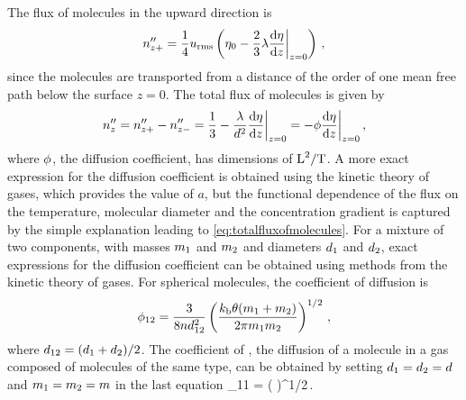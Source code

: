 The flux of molecules in the upward direction is
\begin{equation}\label{eq:totalupfluxofmolecules}
{n}^{\prime\prime}_{z+} = \dfrac{1}{4}u_\text{rms}
                    \left(\eta_0 - \dfrac{2}{3}\lambda\dfrac{\text{d}{\eta}}{\text{d}{z}}\biggr\rvert_{z = 0}\right)\,,
\end{equation}
since the molecules are transported from a distance of the order of one mean free path below the surface $z = 0$. The total flux of molecules is given by
\begin{equation}\label{eq:totalfluxofmolecules}
{n}^{\prime\prime}_{z} = {n}^{\prime\prime}_{z+} - {n}^{\prime\prime}_{z-}
                = \dfrac{1}{3} - \dfrac{\lambda}{d^2}\dfrac{\text{d}{\eta}}{\text{d}{z}}\biggr\rvert_{z = 0}
                = -\phi\dfrac{\text{d}{\eta}}{\text{d}{z}}\biggr\rvert_{z = 0}\,,
\end{equation}
where $\phi$, the diffusion coefficient, has dimensions of $\text{L}^2/\text{T}$. A more exact expression for the diffusion coefficient is obtained using the kinetic theory of gases, which provides the value of $a$, but the functional dependence of the flux on the temperature, molecular diameter and the concentration gradient is captured by the simple explanation leading to \cref{eq:totalfluxofmolecules}. For a mixture of two components, with masses $m_1$ and $m_2$ and diameters $d_1$ and $d_2$, exact expressions for the diffusion coefficient can be obtained using methods from the kinetic theory of gases. For spherical molecules, the coefficient of diffusion is
\begin{equation}\label{eq:diffcoefficientformixtures}
\phi_{12} = \dfrac{3}{8nd_{12}^2}
                \left(
                    \dfrac{k_\text{b}\theta(m_1 + m_2)}{2\pi m_1m_2}
                \right)^{1/2}\,,
\end{equation}
where $d_{12} = (d_1 + d_2)/2$. The coefficient of , the diffusion of a molecule in a gas composed of molecules of the same type, can be obtained by setting $d_1 = d_2 = d$ and $m_1 = m_2 = m$ in the last equation
\beq
\kdiff_{11} = 
                \left(
                    \dfrac{\kboltz\temp}{\pi\mass}
                \right)^{1/2}\,.
\eeq

